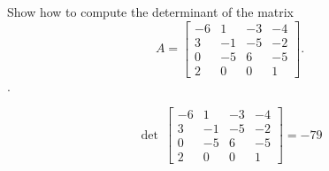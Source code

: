 
\begin{exerciseStatement}


Show how to compute the determinant of the matrix \[A= \left[\begin{array}{cccc}
-6 & 1 & -3 & -4 \\
3 & -1 & -5 & -2 \\
0 & -5 & 6 & -5 \\
2 & 0 & 0 & 1
\end{array}\right] .\].


\end{exerciseStatement}
    
\begin{exerciseAnswer} 
\[\operatorname{det}\  \left[\begin{array}{cccc}
-6 & 1 & -3 & -4 \\
3 & -1 & -5 & -2 \\
0 & -5 & 6 & -5 \\
2 & 0 & 0 & 1
\end{array}\right] = -79 \]
\end{exerciseAnswer}
    
